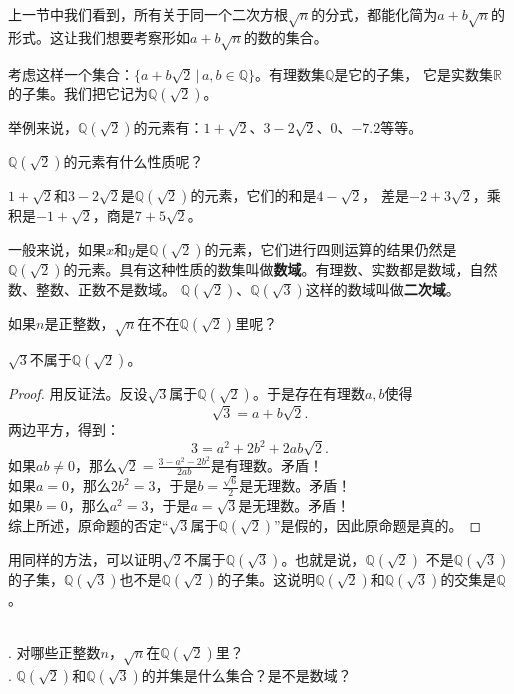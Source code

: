 \documentclass[12pt,UTF8]{ctexbook}
\begin{document}
上一节中我们看到，所有关于同一个二次方根$\sqrt{n}$的分式，都能化简为$a + b\sqrt{n}$的形式。这让我们想要考察形如$a + b\sqrt{n}$的数的集合。

考虑这样一个集合：$\{a + b\sqrt{2} \, | \, a, b \in\mathbb{Q}\}$。有理数集$\mathbb{Q}$是它的子集，
它是实数集$\mathbb{R}$的子集。我们把它记为$\mathbb{Q}(\sqrt{2})$。

举例来说，$\mathbb{Q}(\sqrt{2})$的元素有：$1 + \sqrt{2}$、$3 - 2\sqrt{2}$、$0$、$-7.2$等等。

$\mathbb{Q}(\sqrt{2})$的元素有什么性质呢？

$1 + \sqrt{2}$和$3 - 2\sqrt{2}$是$\mathbb{Q}(\sqrt{2})$的元素，它们的和是$4 - \sqrt{2}$，
差是$-2 + 3\sqrt{2}$，乘积是$-1 + \sqrt{2}$，商是$7 + 5\sqrt{2}$。

一般来说，如果$x$和$y$是$\mathbb{Q}(\sqrt{2})$的元素，它们进行四则运算的结果仍然是$\mathbb{Q}(\sqrt{2})$的元素。具有这种性质的数集叫做\textbf{数域}。有理数、实数都是数域，自然数、整数、正数不是数域。
$\mathbb{Q}(\sqrt{2})$、$\mathbb{Q}(\sqrt{3})$这样的数域叫做\textbf{二次域}。

如果$n$是正整数，$\sqrt{n}$在不在$\mathbb{Q}(\sqrt{2})$里呢？
\begin{tm}
    $\sqrt{3}$不属于$\mathbb{Q}(\sqrt{2})$。
\end{tm}\label{tm:3-1-0}
\begin{proof}
    用反证法。反设$\sqrt{3}$属于$\mathbb{Q}(\sqrt{2})$。于是存在有理数$a,b$使得
    $$ \sqrt{3} = a + b\sqrt{2}.$$
    两边平方，得到：
    $$ 3 = a^2 + 2b^2 + 2ab\sqrt{2}.$$
    如果$ab \neq 0$，那么$ \sqrt{2} = \frac{3 - a^2 - 2b^2}{2ab}$是有理数。矛盾！\\
    如果$a = 0$，那么$2b^2 = 3$，于是$b = \frac{\sqrt{6}}{2}$是无理数。矛盾！\\
    如果$b = 0$，那么$a^2 = 3$，于是$a = \sqrt{3}$是无理数。矛盾！\\
    综上所述，原命题的否定“$\sqrt{3}$属于$\mathbb{Q}(\sqrt{2})$”是假的，因此原命题是真的。
\end{proof}

用同样的方法，可以证明$\sqrt{2}$不属于$\mathbb{Q}(\sqrt{3})$。也就是说，$\mathbb{Q}(\sqrt{2})$
不是$\mathbb{Q}(\sqrt{3})$的子集，$\mathbb{Q}(\sqrt{3})$也不是$\mathbb{Q}(\sqrt{2})$的子集。这说明$\mathbb{Q}(\sqrt{2})$和$\mathbb{Q}(\sqrt{3})$的交集是$\mathbb{Q}$。

\begin{sk}\label{sk:3-2-0}
    \mbox{}\\
    . 对哪些正整数$n$，$\sqrt{n}$在$\mathbb{Q}(\sqrt{2})$里？\\
    . $\mathbb{Q}(\sqrt{2})$和$\mathbb{Q}(\sqrt{3})$的并集是什么集合？是不是数域？
\end{sk}
\end{document}
